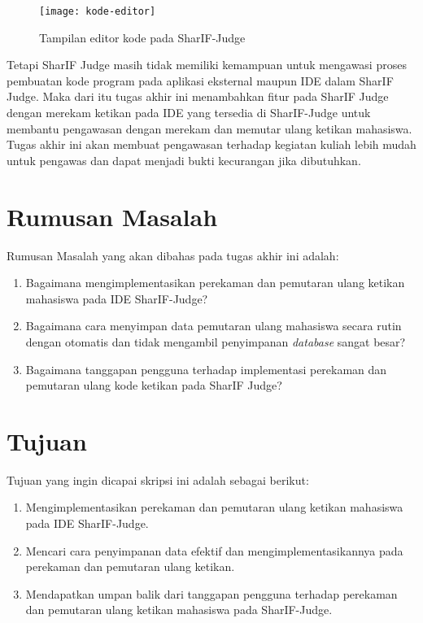 \begin{figure}
    \centering
    \texttt{[image: kode-editor]}
    \caption[Tampilan editor kode pada SharIF-Judge]{Tampilan editor kode pada SharIF-Judge}
    \label{fig:1:editor-kode}
\end{figure}

Tetapi SharIF Judge masih tidak memiliki kemampuan untuk mengawasi proses pembuatan kode program pada aplikasi eksternal maupun IDE dalam SharIF Judge. Maka dari itu tugas akhir ini menambahkan fitur pada SharIF Judge dengan merekam ketikan pada IDE yang tersedia di SharIF-Judge untuk membantu pengawasan dengan merekam dan memutar ulang ketikan mahasiswa. Tugas akhir ini akan membuat pengawasan terhadap kegiatan kuliah lebih mudah untuk pengawas dan dapat menjadi bukti kecurangan jika dibutuhkan.

\section{Rumusan Masalah}
\label{sec:1:rumusan}

Rumusan Masalah yang akan dibahas pada tugas akhir ini adalah:
\begin{enumerate}
    \item Bagaimana mengimplementasikan perekaman dan pemutaran ulang ketikan mahasiswa pada IDE SharIF-Judge?
    \item Bagaimana cara menyimpan data pemutaran ulang mahasiswa secara rutin dengan otomatis dan tidak mengambil penyimpanan \textit{database} sangat besar?
    \item Bagaimana tanggapan pengguna terhadap implementasi perekaman dan pemutaran ulang kode ketikan pada SharIF Judge?
\end{enumerate}

\section{Tujuan}
\label{sec:1:tujuan}

Tujuan yang ingin dicapai skripsi ini adalah sebagai berikut:
\begin{enumerate}
    \item Mengimplementasikan perekaman dan pemutaran ulang ketikan mahasiswa pada IDE SharIF-Judge.
    \item Mencari cara penyimpanan data efektif dan mengimplementasikannya pada perekaman dan pemutaran ulang ketikan.
    \item Mendapatkan umpan balik dari tanggapan pengguna terhadap perekaman dan pemutaran ulang ketikan mahasiswa pada SharIF-Judge.
\end{enumerate}

